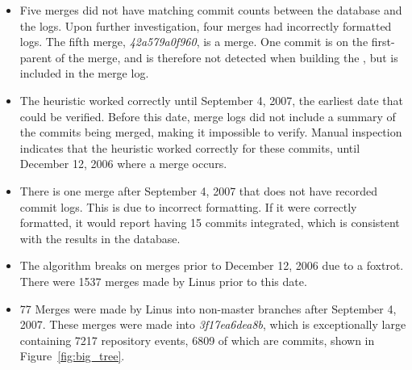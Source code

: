 \begin{itemize}
  \item

    Five merges did not have matching commit counts between the database
    and the logs. Upon further investigation, four merges had
    incorrectly formatted logs. The fifth merge,
    \emph{42a579a0f960}, is a \foxtrot{}
    merge. One commit is on the first-parent of the merge, and is
    therefore not detected when building the \mt{}, but is included
    in the merge log.

  \item

    The heuristic worked correctly until September 4, 2007, the earliest
    date that could be verified. Before this date, merge logs did not
    include a summary of the commits being merged, making it impossible
    to verify. Manual inspection indicates that the heuristic worked
    correctly for these commits, until December 12, 2006 where a
    \foxtrot{} merge occurs.

  \item

    There is one merge after September 4, 2007
    that does not have recorded commit logs.
    This is due to incorrect formatting.
    If it were correctly formatted, it would report having 15 commits integrated,
    which is consistent with the results in the database.

  \item

    The algorithm breaks on merges prior to December 12, 2006 due to a
    foxtrot. There were 1537 merges made by Linus prior to this date.

  \item

    77 Merges were made by Linus into non-master branches after
    September 4, 2007. These merges were made into
    \emph{3f17ea6dea8b}, which is
    exceptionally large containing 7217 repository events, 6809 of
    which are commits, shown in Figure~\ref{fig:big_tree}.

\end{itemize}

